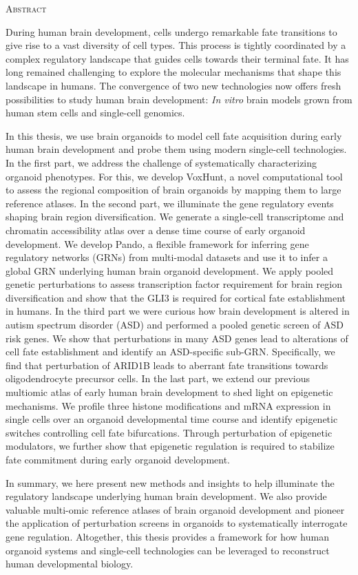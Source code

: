 \begin{center}
    \large\textsc{Abstract}
\end{center}

During human brain development, cells undergo remarkable fate transitions to give rise to a vast diversity of cell types. This process is tightly coordinated by a complex regulatory landscape that guides cells towards their terminal fate. It has long remained challenging to explore the molecular mechanisms that shape this landscape in humans. The convergence of two new technologies now offers fresh possibilities to study human brain development: \textit{In vitro} brain models grown from human stem cells and single-cell genomics. 

In this thesis, we use brain organoids to model cell fate acquisition during early human brain development and probe them using modern single-cell technologies. In the first part, we address the challenge of systematically characterizing organoid phenotypes. For this, we develop VoxHunt, a novel computational tool to assess the regional composition of brain organoids by mapping them to large reference atlases. In the second part, we illuminate the gene regulatory events shaping brain region diversification. We generate a single-cell transcriptome and chromatin accessibility atlas over a dense time course of early organoid development. We develop Pando, a flexible framework for inferring gene regulatory networks (GRNs) from multi-modal datasets and use it to infer a global GRN underlying human brain organoid development. We apply pooled genetic perturbations to assess transcription factor requirement for brain region diversification and show that the GLI3 is required for cortical fate establishment in humans. In the third part we were curious how brain development is altered in autism spectrum disorder (ASD) and performed a pooled genetic screen of ASD risk genes. We show that perturbations in many ASD genes lead to alterations of cell fate establishment and identify an ASD-specific sub-GRN. Specifically, we find that perturbation of ARID1B leads to aberrant fate transitions towards oligodendrocyte precursor cells. In the last part, we extend our previous multiomic atlas of early human brain development to shed light on epigenetic mechanisms. We profile three histone modifications and mRNA expression in single cells over an organoid developmental time course and identify epigenetic switches controlling cell fate bifurcations. Through perturbation of epigenetic modulators, we further show that epigenetic regulation is required to stabilize fate commitment during early organoid development. 

In summary, we here present new methods and insights to help illuminate the regulatory landscape underlying human brain development. We also provide valuable multi-omic reference atlases of brain organoid development and pioneer the application of perturbation screens in organoids to systematically interrogate gene regulation. Altogether, this thesis provides a framework for how human organoid systems and single-cell technologies can be leveraged to reconstruct human developmental biology.


